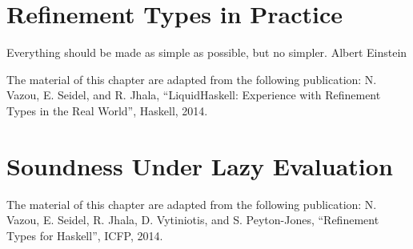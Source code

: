 \chapter{Refinement Types in Practice}\label{chapter:tool}
\makequote
{Everything should be made as simple as possible, but no simpler.}
{Albert Einstein}


\begin{comment}
“One day I will find the right words, and they will be simple.” 
― Jack Kerouac, The Dharma Bums


“Life is really simple, but we insist on making it complicated.” ~ Confucius

“Knowledge is a process of piling up facts; wisdom lies in their simplification.” ~ Martin H. Fischer


“If you can’t explain it to a six year old, you don’t understand it yourself.” ~ Albert Einstein
\end{comment}









The material of this chapter are adapted from the following publication:
\noindent N. Vazou, E. Seidel, and R. Jhala,
``LiquidHaskell: Experience with Refinement Types in the Real World'', 
Haskell, 2014.


\chapter{Soundness Under Lazy Evaluation}\label{chapter:refinedhaskell}










The material of this chapter are adapted from the following publication:
\noindent N. Vazou, E. Seidel, R. Jhala, D. Vytiniotis, and S. Peyton-Jones,
``Refinement Types for Haskell'', 
ICFP, 2014.
